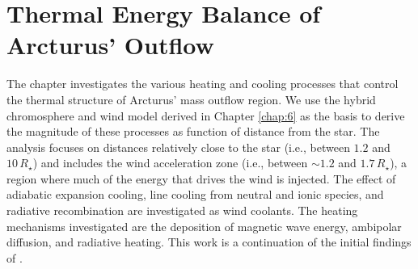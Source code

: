 \chapter{Thermal Energy Balance of Arcturus' Outflow}
\label{chap:7}

The chapter investigates the various heating and cooling processes that control the thermal structure of Arcturus' mass outflow region. We use the hybrid chromosphere and wind model derived in Chapter \ref{chap:6} as the basis to derive the magnitude of these processes as function of distance from the star. The analysis focuses on distances relatively close to the star (i.e., between $1.2$ and $10\,R_{\star}$) and includes the wind acceleration zone (i.e., between $\sim 1.2$ and $1.7\,R_{\star}$), a region where much of the energy that drives the wind is injected. The effect of adiabatic expansion cooling, line cooling from neutral and ionic species, and radiative recombination are investigated as wind coolants. The heating mechanisms investigated are the deposition of magnetic wave energy, ambipolar diffusion, and radiative heating. This work is a continuation of the initial findings of \cite{ogorman_2011}.

\pagebreak

